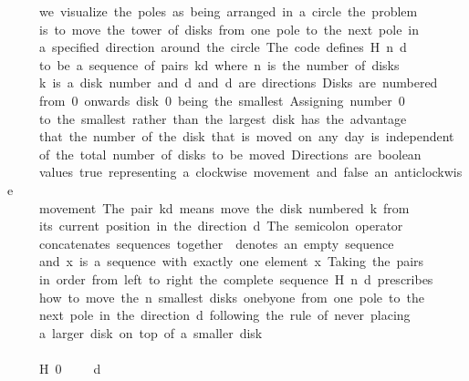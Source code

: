 \documentclass[a4paper]{article}
\begin{document}
\begin{tabbing}
\ttfamily ~~~~~we~visualize~the~poles~as~being~arranged~in~a~circle~the~problem\\
\ttfamily ~~~~~is~to~move~the~tower~of~disks~from~one~pole~to~the~next~pole~in\\
\ttfamily ~~~~~a~specified~direction~around~the~circle~The~code~defines~H~n~d\\
\ttfamily ~~~~~to~be~a~sequence~of~pairs~kd~where~n~is~the~number~of~disks\\
\ttfamily ~~~~~k~is~a~disk~number~and~d~and~d~are~directions~Disks~are~numbered\\
\ttfamily ~~~~~from~0~onwards~disk~0~being~the~smallest~Assigning~number~0\\
\ttfamily ~~~~~to~the~smallest~rather~than~the~largest~disk~has~the~advantage\\
\ttfamily ~~~~~that~the~number~of~the~disk~that~is~moved~on~any~day~is~independent\\
\ttfamily ~~~~~of~the~total~number~of~disks~to~be~moved~Directions~are~boolean\\
\ttfamily ~~~~~values~true~representing~a~clockwise~movement~and~false~an~anticlockwise\\
\ttfamily ~~~~~movement~The~pair~kd~means~move~the~disk~numbered~k~from\\
\ttfamily ~~~~~its~current~position~in~the~direction~d~The~semicolon~operator\\
\ttfamily ~~~~~concatenates~sequences~together~~denotes~an~empty~sequence\\
\ttfamily ~~~~~and~x~is~a~sequence~with~exactly~one~element~x~Taking~the~pairs\\
\ttfamily ~~~~~in~order~from~left~to~right~the~complete~sequence~H~n~d~prescribes\\
\ttfamily ~~~~~how~to~move~the~n~smallest~disks~onebyone~from~one~pole~to~the\\
\ttfamily ~~~~~next~pole~in~the~direction~d~following~the~rule~of~never~placing\\
\ttfamily ~~~~~a~larger~disk~on~top~of~a~smaller~disk\\
\ttfamily ~~~~~\\
\ttfamily ~~~~~H~0~~~~~d~~\\

\end{tabbing}
\end{document}
